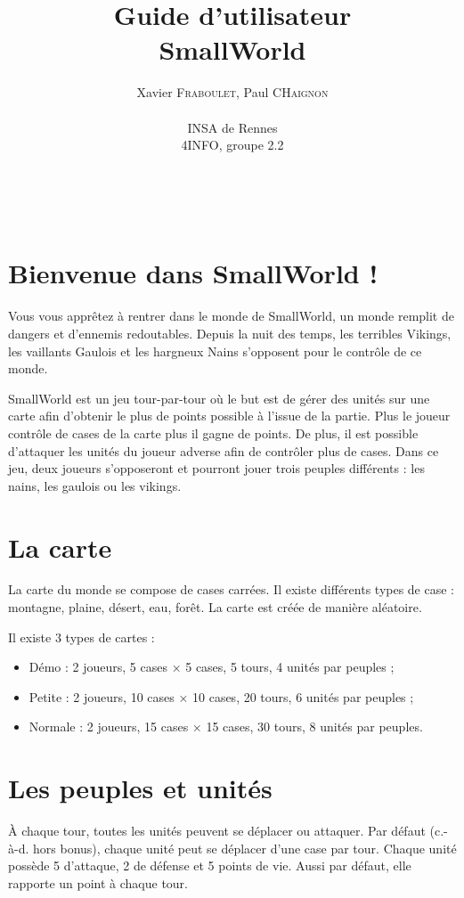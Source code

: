 \documentclass[a4paper,12pt]{article}
\author{
  Xavier \textsc{Fraboulet}, Paul \textsc{CHaignon} \\ \\
  INSA de Rennes \\
  4INFO, groupe 2.2
}
\title{Guide d'utilisateur \\ SmallWorld}
\begin{document}
\maketitle

\thispagestyle{empty}
\newpage

~~
\thispagestyle{empty}
\newpage


\tableofcontents
\newpage

\section{Bienvenue dans SmallWorld !}

Vous vous apprêtez à rentrer dans le monde de SmallWorld, un monde remplit de dangers et d'ennemis redoutables. Depuis la nuit des temps, les terribles Vikings, les vaillants Gaulois et les hargneux Nains s'opposent pour le contrôle de ce monde. 

SmallWorld est un jeu tour-par-tour où le but est de gérer des unités sur une carte afin d'obtenir le plus de points possible à l'issue de la partie. Plus le joueur contrôle de cases de la carte plus il gagne de points. De plus, il est possible d'attaquer les unités du joueur adverse afin de contrôler plus de cases. Dans ce jeu, deux joueurs s'opposeront et pourront jouer trois peuples différents : les nains, les gaulois ou les vikings.



\section{La carte}
La carte du monde se compose de cases carrées. Il existe différents types de case : montagne, plaine, désert, eau, forêt. La carte est créée de manière aléatoire.

Il existe 3 types de cartes :

\begin{itemize}
\item Démo : 2 joueurs, 5 cases × 5 cases, 5 tours, 4 unités par peuples ;
\item Petite : 2 joueurs, 10 cases × 10 cases, 20 tours, 6 unités par peuples ;
\item Normale : 2 joueurs, 15 cases × 15 cases, 30 tours, 8 unités par peuples.
\end{itemize}


\section{Les peuples et unités}
À chaque tour, toutes les unités peuvent se déplacer ou attaquer. Par défaut (c.-à-d. hors bonus), chaque unité peut se déplacer d’une case par tour. Chaque unité possède 5 d’attaque, 2 de défense et 5 points de vie. Aussi par défaut, elle rapporte un point à chaque tour.
\end{document}

